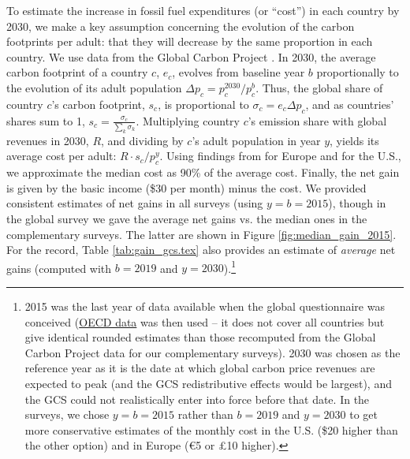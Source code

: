 To estimate the increase in fossil fuel expenditures (or ``cost'') in each country by 2030, we make a key assumption concerning the evolution of the carbon footprints per adult: that they will decrease by the same proportion %
in each country. We use data from the Global Carbon Project . 
In 2030, the average carbon footprint of a country $c$, $e_c$, evolves from baseline year $b$ proportionally to the evolution of its adult population $\Delta p_c = p^{2030}_c/p^b_c$. Thus, the global share of country $c$'s carbon footprint, $s_c$, is proportional to $\sigma_c = e_c \Delta p_c$, and as countries' shares sum to 1, $s_c = \frac{\sigma_c}{\sum_k \sigma_k}$. Multiplying country $c$'s emission share with global revenues in 2030, $R$, and dividing by $c$'s adult population in year $y$, yields its average cost per adult: $R \cdot s_c / p^y_c$. %
Using findings from  for Europe and  for the U.S., we approximate the median cost as 90\% of the average cost. Finally, the net gain is given by the basic income (\$30 per month) minus the cost. We provided consistent estimates of net gains in all surveys (using $y = b = 2015$), though in the global survey we gave the average net gains vs. the median ones in the complementary surveys. The latter are shown in Figure \ref{fig:median_gain_2015}. 
For the record, Table \ref{tab:gain_gcs.tex} also provides an estimate of \textit{average} net gains (computed with $b = 2019$ and $y = 2030$).\footnote{2015 was the last year of data available when the global questionnaire was conceived (\href{https://stats.oecd.org/Index.aspx?DataSetCode=IO_GHG_2019}{OECD data} was then used -- it does not cover all countries but give identical rounded estimates than those recomputed from the Global Carbon Project data for our complementary surveys). 2030 was chosen as the reference year as it is the date at which global carbon price revenues are expected to peak (and the GCS redistributive effects would be largest), and the GCS could not realistically enter into force before that date. In the surveys, we chose $y = b = 2015$ rather than $b = 2019$ and $y = 2030$ to get more conservative estimates of the monthly cost in the U.S. (\$20 higher than the other option) and in Europe (\euro{5} or £10 higher).}%


